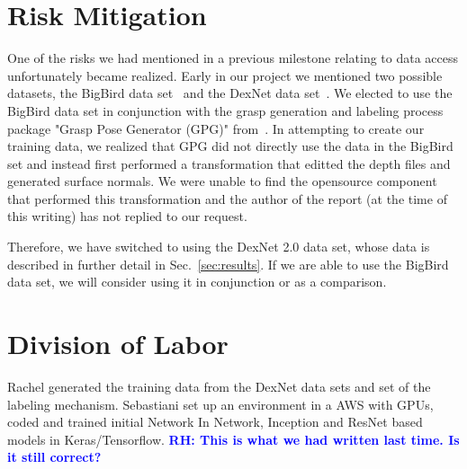 \documentclass[letterpaper, 10 pt]{article}
\newcommand{\sref}[1]{Sec.~\ref{#1}} %
\newcommand{\rhnote}[1]{\ifthenelse{\boolean{include-notes}}%
 {\textcolor{blue}{\textbf{RH: #1}}}{}}
\begin{document}
\section{Risk Mitigation}
\label{sec:risk}
One of the risks we had mentioned in a previous milestone relating to data access unfortunately became realized. 
Early in our project we mentioned two possible datasets, the BigBird data set~\cite{singh2014bigbird} and the DexNet data set~\cite{mahler2017dex}.
We elected to use the BigBird data set in conjunction with the grasp generation and labeling process package "Grasp Pose Generator (GPG)" from~\cite{pas2017grasp}.
In attempting to create our training data, we realized that GPG did not directly use the data in the BigBird set and instead first performed a transformation that editted the depth files and generated surface normals. 
We were unable to find the opensource component that performed this transformation and the author of the report (at the time of this writing) has not replied to our request. 

Therefore, we have switched to using the DexNet 2.0 data set, whose data is described in further detail in \sref{sec:results}. 
If we are able to use the BigBird data set, we will consider using it in conjunction or as a comparison. 

\section{Division of Labor}

Rachel generated the training data from the DexNet data sets and set of the labeling mechanism. 
Sebastiani set up an environment in a AWS with GPUs, coded and trained initial Network In Network, Inception and ResNet based models in Keras/Tensorflow.  \rhnote{This is what we had written last time. Is it still correct?}

{\footnotesize
    
}
\end{document}
